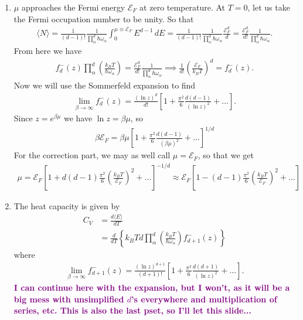 \documentclass{article}
\theoremstyle{definition}
\newcommand{\al}{\alpha}
\newcommand{\be}{\beta}
\newcommand{\f}[2]{\frac{#1}{#2}}
\newcommand{\lp}{\left(}
\newcommand{\rp}{\right)}
\newcommand{\lb}{\left[}
\newcommand{\rb}{\right]}
\newcommand{\lc}{\left\{}
\newcommand{\rc}{\right\}}
\begin{document}
\begin{enumerate}[label=(\alph*)]
	\item $\mu$ approaches the Fermi energy $\mathcal{E}_F$ at zero temperature. At $T=0$, let us take the Fermi occupation number to be unity. So that
	\begin{align*}
	\langle N \rangle = \f{1}{(d-1)!} \f{1}{\prod_\al^d \hbar \omega_\al} \int_0^{\mu \equiv \mathcal{E}_F} E^{d-1} \,dE = \f{1}{(d-1)!} \f{1}{\prod_\al^d \hbar \omega_\al} \f{\mathcal{E}_F^d}{d} = \f{\mathcal{E}_F^d}{d!} \f{1}{\prod_\al^d \hbar \omega_\al}.
	\end{align*}
	From here we have
	\begin{align*}
	f^-_d(z) \prod_\al^d \lp \f{k_BT}{\hbar \omega_\al} \rp = \f{\mathcal{E}_F^d}{d!} \f{1}{\prod_\al^d \hbar \omega_\al} \implies \f{1}{d!} \lp \f{\mathcal{E}_F}{k_BT}\rp^d =  f_d^-(z).
	\end{align*}
	Now we will use the Sommerfeld expansion  to find 
	\begin{align*}
	\lim_{\be\to \infty} f_d^-(z) = \f{(\ln z)^d}{d!}\lb 1 + \f{\pi^2}{6} \f{d(d-1)}{(\ln z)^2} + \dots \rb.
	\end{align*}
	Since $z = e^{\be \mu}$ we have $\ln z = \be \mu$, so 
	\begin{align*}
	\be \mathcal{E}_F = \be \mu \lb 1 + \f{\pi^2}{6} \f{d(d-1)}{(\be \mu)^2} + \dots \rb^{1/d}
	\end{align*}
	For the correction part, we may as well call $\mu = \mathcal{E}_F$, so that we get
	\begin{align*}
	\boxed{\mu} = \mathcal{E}_F \lb 1 + d(d-1) \f{\pi^2}{6}\lp \f{k_B T}{\mathcal{E}_F}\rp^2 + \dots \rb^{-1/d} \approx \boxed{\mathcal{E}_F \lb 1 - (d-1) \f{\pi^2}{6} \lp \f{k_BT}{\mathcal{E}_F} \rp^2 + \dots \rb}
	\end{align*}
	
	\item The heat capacity is given by 
	\begin{align*}
	C_V &= \f{d\langle E\rangle }{dT} \\
	&= \f{d}{dT} \lc k_B T d  \prod_\al^d \lp \f{k_BT}{\hbar \omega_\al}\rp f^-_{d+1}(z)  \rc
	\end{align*}
	where
	\begin{align*}
	\lim_{\be\to \infty } f_{d+1}^-(z) =  \f{(\ln z)^{d+1}}{(d+1)!}\lb 1 + \f{\pi^2}{6} \f{d(d+1)}{(\ln z)^2} + \dots \rb.
	\end{align*}
	\textbf{\textcolor{purple}{I can continue here with the expansion, but I won't, as it will be a big mess with unsimplified $d$'s everywhere and multiplication of series, etc. This is also the last pset, so I'll let this slide...}}
\end{enumerate}
\end{document}
